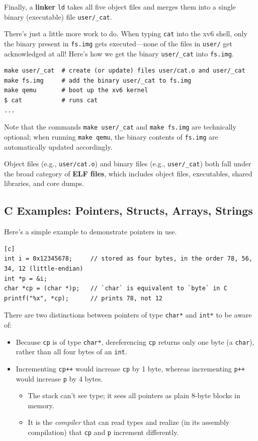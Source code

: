 Finally, a \textbf{linker} \verb|ld| takes all five object files
and merges them into a single binary (executable) file \verb|user/_cat|.

There's just a little more work to do.
When typing \verb|cat| into the xv6 shell,
only the binary present in \verb|fs.img| gets executed---none
of the files in \verb|user/| get acknowledged at all!
Here's how we get the binary \verb|user/_cat| into \verb|fs.img|.
\begin{verbatim}
make user/_cat  # create (or update) files user/cat.o and user/_cat
make fs.img     # add the binary user/_cat to fs.img
make qemu       # boot up the xv6 kernel
$ cat           # runs cat
...
\end{verbatim}
Note that the commands \verb|make user/_cat| and \verb|make fs.img|
are technically optional;
when running \verb|make qemu|, the binary contents of \verb|fs.img|
are automatically updated accordingly.

\begin{remark}
    Object files (e.g., \verb|user/cat.o|)
    and binary files (e.g., \verb|user/_cat|)
    both fall under the broad category of \textbf{ELF files},
    which includes object files, executables,
    shared libraries, and core dumps.
\end{remark}

\subsection{C Examples: Pointers, Structs, Arrays, Strings}

Here's a simple example to demonstrate pointers in use.

\begin{verbatim}[c]
int i = 0x12345678;     // stored as four bytes, in the order 78, 56, 34, 12 (little-endian)
int *p = &i;
char *cp = (char *)p;   // `char` is equivalent to `byte` in C
printf("%x", *cp);      // prints 78, not 12
\end{verbatim}

There are two distinctions between pointers of type
\verb|char*| and \verb|int*| to be aware of:
\begin{itemize}
    \item Because \verb|cp| is of type \verb|char*|,
    dereferencing \verb|cp| returns only one byte (a \verb|char|),
    rather than all four bytes of an \verb|int|.
    \item Incrementing \verb|cp++| would increase \verb|cp| by 1 byte,
    whereas incrementing \verb|p++| would increase \verb|p| by 4 bytes.
    \begin{itemize}
        \item The stack can't see type; it sees all pointers as
        plain 8-byte blocks in memory.
        \item It is the \emph{compiler} that can read types
        and realize (in its assembly compilation) that
        \verb|cp| and \verb|p| increment differently.
    \end{itemize}
\end{itemize}

